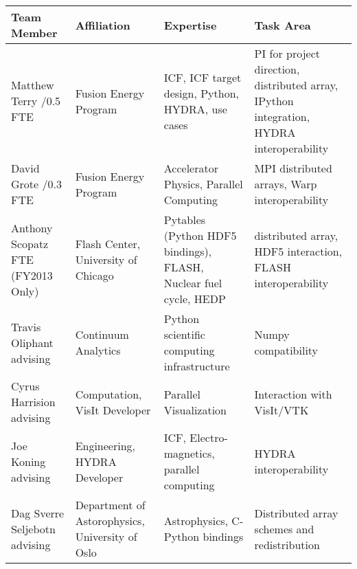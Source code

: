 \documentclass[letterpaper,12pt]{article}
\newlength{\DUtablewidth} %
\begin{document}
\setlength{\DUtablewidth}{\linewidth}
\begin{longtable*}[c]
	{|p{0.187\DUtablewidth}|p{0.251\DUtablewidth}|p{0.260\DUtablewidth}|p{0.251\DUtablewidth}|}
	\hline
	\textbf{Team Member} & \textbf{Affiliation} & \textbf{Expertise} & \textbf{Task Area} \\
	\endfirsthead
	\hline

	Matthew Terry /0.5 FTE &
	Fusion Energy Program &
	ICF, ICF target design, Python, HYDRA, use cases &
	PI for project direction,
	distributed array, IPython integration, HYDRA interoperability \\
	\hline

	David Grote /0.3 FTE &
	Fusion Energy Program &
	Accelerator Physics, Parallel Computing &
	MPI distributed arrays, Warp interoperability \\
	\hline

	Anthony Scopatz  FTE (FY2013 Only) &
	Flash Center, \newline
	University of Chicago &
	Pytables (Python HDF5 bindings), FLASH, Nuclear fuel cycle, HEDP &
	distributed array, HDF5 interaction, FLASH interoperability \\
	\hline

	Travis Oliphant \newline
	advising &
	Continuum Analytics &
	Python scientific computing infrastructure &
	Numpy compatibility \\
	\hline

	Cyrus Harrision \newline
	advising &
	Computation, \newline
	VisIt Developer &
	Parallel Visualization &
	Interaction with VisIt/VTK  \\
	\hline

	Joe Koning \newline
	advising &
	Engineering, \newline
	HYDRA Developer & 
	ICF, Electro-magnetics, parallel computing & 
	HYDRA interoperability \\
	\hline

	Dag Sverre Seljebotn \newline
	advising &
	Department of Astorophysics, \newline
	University of Oslo &
	Astrophysics, C-Python bindings &
	Distributed array schemes and redistribution \\
	\hline
\end{longtable*}



\end{document}
